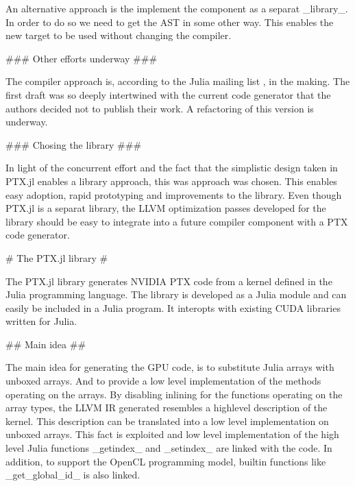 \begin{markdown}
An alternative approach is the implement the component as a separat
_library_. In order to do so we need to get the AST in some other
way. This enables the new target to be used without changing the
compiler.

### Other efforts underway ###

The compiler approach is, according to the Julia mailing list
\cite{julia-dev}, in the making. The first draft was so deeply
intertwined with the current code generator that the authors decided
not to publish their work. A refactoring of this version is underway.

### Chosing the library ###

In light of the concurrent effort and the fact that the simplistic
design taken in PTX.jl enables a library approach, this was approach
was chosen. This enables easy adoption, rapid prototyping and
improvements to the library. Even though PTX.jl is a separat library,
the LLVM optimization passes developed for the library should be easy
to integrate into a future compiler component with a PTX code
generator.

# The PTX.jl library #
\label{sec:meth:ptx}
  
The PTX.jl library generates NVIDIA PTX code from a kernel defined in
the Julia programming language. The library is developed as a Julia
module and can easily be included in a Julia program. It interopts
with existing CUDA libraries written for Julia. 

## Main idea ##
\label{sec:meth:idea}

The main idea for generating the GPU code, is to substitute Julia
arrays with unboxed arrays. And to provide a low level implementation
of the methods operating on the arrays. By disabling inlining for the
functions operating on the array types, the LLVM IR generated
resembles a highlevel description of the kernel. This description can
be translated into a low level implementation on unboxed arrays. This
fact is exploited and low level implementation of the high level Julia
functions _getindex_ and _setindex_ are linked with the code. In
addition, to support the OpenCL programming model, builtin
functions like _get_global_id_ is also linked.


\end{markdown}
